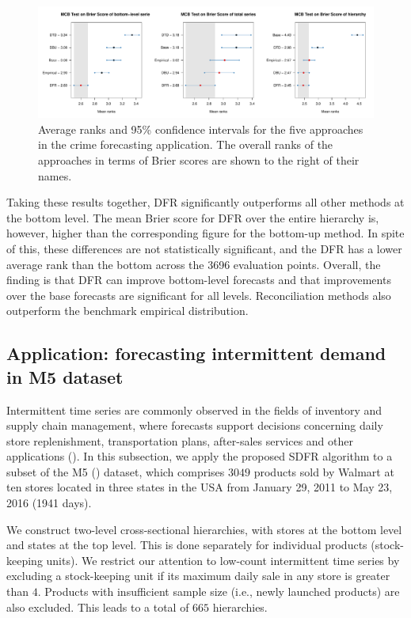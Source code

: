 \documentclass[a4paper,review,12pt,authoryear]{elsarticle}
\theoremstyle{definition}
\begin{document}
     \begin{figure}[h]
       \caption{\label{fig:application_crime}Average ranks and 95\% confidence intervals for the five approaches in the crime forecasting application. The overall ranks of the approaches in terms of Brier scores are shown to the right of their names.}
       \centering
       \includegraphics[width=\textwidth]{figures/dc_crime_mcb.pdf}
     \end{figure}


     Taking these results together, DFR significantly outperforms all other methods at the bottom level. The mean Brier score for DFR over the entire hierarchy is, however, higher than the corresponding figure for the bottom-up method. In spite of this, these differences are not statistically significant, and the DFR has a lower average rank than the bottom across the 3696 evaluation points. Overall, the finding is that DFR can improve bottom-level forecasts and that improvements over the base forecasts are significant for all levels. Reconciliation methods also outperform the benchmark empirical distribution.
     
     \subsection{Application: forecasting intermittent demand in M5 dataset}
     \label{sec:M5}

     Intermittent time series are commonly observed in the fields of inventory and supply chain management, where forecasts support decisions concerning daily store replenishment, transportation plans, after-sales services and other applications (\citealp{babaiDemandForecastingSupply2022}). In this subsection, we apply the proposed SDFR algorithm to a subset of the M5 (\citealp{makridakisM5AccuracyCompetition2022}) dataset, which comprises $3049$ products sold by Walmart at ten stores located in three states in the USA from January 29, 2011 to May 23, 2016 (1941 days).
     
     We construct two-level cross-sectional hierarchies, with stores at the bottom level and states at the top level. This is done separately for individual products (stock-keeping units). We restrict our attention to low-count intermittent time series by excluding a stock-keeping unit if its maximum daily sale in any store is greater than $4$. Products with insufficient sample size (i.e., newly launched products) are also excluded. This leads to a total of $665$ hierarchies.
     
\end{document}
